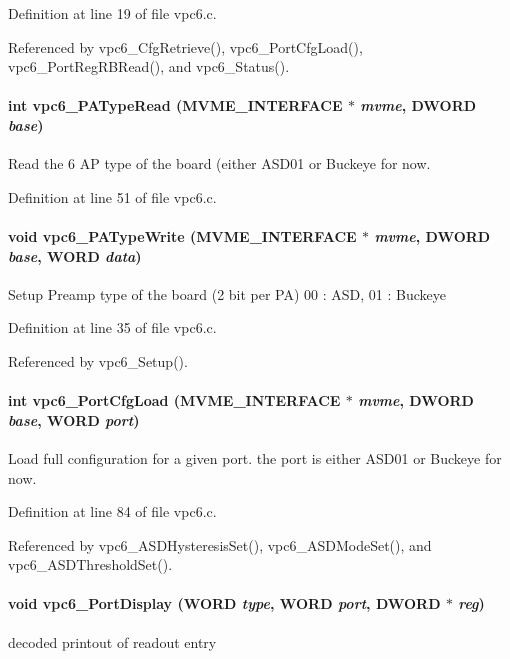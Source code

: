 Definition at line 19 of file vpc6.c.

Referenced by vpc6\_\-CfgRetrieve(), vpc6\_\-PortCfgLoad(), vpc6\_\-PortRegRBRead(), and vpc6\_\-Status().
\paragraph[{vpc6\_\-PATypeRead}]{\setlength{\rightskip}{0pt plus 5cm}int vpc6\_\-PATypeRead ({\bf MVME\_\-INTERFACE} $\ast$ {\em mvme}, \/  {\bf DWORD} {\em base})}\hfill\label{vpc6_8c_afb94d63b60eab3d570396b532e3fdeec}
Read the 6 AP type of the board (either ASD01 or Buckeye for now. 

Definition at line 51 of file vpc6.c.
\paragraph[{vpc6\_\-PATypeWrite}]{\setlength{\rightskip}{0pt plus 5cm}void vpc6\_\-PATypeWrite ({\bf MVME\_\-INTERFACE} $\ast$ {\em mvme}, \/  {\bf DWORD} {\em base}, \/  {\bf WORD} {\em data})}\hfill\label{vpc6_8c_aeebefabbb82c5db323d9d80f554586ce}
Setup Preamp type of the board (2 bit per PA) 00 : ASD, 01 : Buckeye 

Definition at line 35 of file vpc6.c.

Referenced by vpc6\_\-Setup().
\paragraph[{vpc6\_\-PortCfgLoad}]{\setlength{\rightskip}{0pt plus 5cm}int vpc6\_\-PortCfgLoad ({\bf MVME\_\-INTERFACE} $\ast$ {\em mvme}, \/  {\bf DWORD} {\em base}, \/  {\bf WORD} {\em port})}\hfill\label{vpc6_8c_a955d588da5b0d7274438f361309ec07b}
Load full configuration for a given port. the port is either ASD01 or Buckeye for now. 

Definition at line 84 of file vpc6.c.

Referenced by vpc6\_\-ASDHysteresisSet(), vpc6\_\-ASDModeSet(), and vpc6\_\-ASDThresholdSet().
\paragraph[{vpc6\_\-PortDisplay}]{\setlength{\rightskip}{0pt plus 5cm}void vpc6\_\-PortDisplay ({\bf WORD} {\em type}, \/  {\bf WORD} {\em port}, \/  {\bf DWORD} $\ast$ {\em reg})}\hfill\label{vpc6_8c_a30c15080312a5dbb3bfb9bc4e1b21202}
decoded printout of readout entry 

